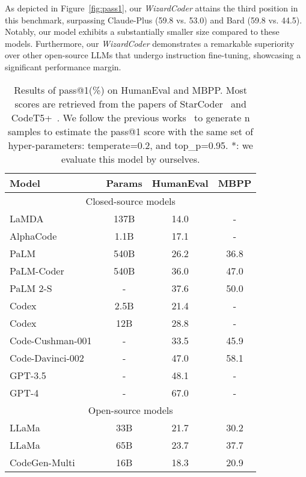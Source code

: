 \documentclass{article}
\newcommand{\modelname}{\emph{WizardCoder}}
\begin{document}
As depicted in Figure~\ref{fig:pass1}, our \modelname{} attains the third position in this benchmark, surpassing Claude-Plus (59.8 vs. 53.0) and Bard (59.8 vs. 44.5). Notably, our model exhibits a substantially smaller size compared to these models. Furthermore, our \modelname{} demonstrates a remarkable superiority over other open-source LLMs that undergo instruction fine-tuning, showcasing a significant performance margin.

\begin{table}
    \centering
    \caption{Results of pass@1(\%) on HumanEval and MBPP. Most scores are retrieved from the papers of StarCoder~\cite{li2023starcoder} and CodeT5+~\cite{CodeT5+}. We follow the previous works~\cite{humeval} to generate n samples to estimate the pass@1 score with the same set of hyper-parameters: temperate=0.2, and top\_p=0.95. *: we evaluate this model by ourselves.}
    \begin{tabular}{lccc}
        \toprule
        \textbf{Model} & \textbf{Params} & \textbf{HumanEval} & \textbf{MBPP} \\
        \midrule
        \multicolumn{4}{c}{Closed-source models}\\
        \midrule
        LaMDA~\cite{LaMDA} & 137B & 14.0 & -\\
        AlphaCode~\cite{AlphaCode} & 1.1B & 17.1 & -\\
        PaLM~\cite{PaLM} & 540B & 26.2 & 36.8\\
        PaLM-Coder~\cite{PaLM} & 540B & 36.0 & 47.0\\
        PaLM 2-S~\cite{palm2} & - & 37.6 & 50.0\\
        Codex~\cite{codex} & 2.5B & 21.4 & -\\
        Codex~\cite{codex} & 12B & 28.8 & -\\
        Code-Cushman-001~\cite{Azure} & - & 33.5 & 45.9\\
        Code-Davinci-002~\cite{Azure} & - & 47.0 & 58.1\\
        GPT-3.5~\cite{GPT4} & - & 48.1 & -\\
        GPT-4~\cite{GPT4} & - & 67.0 & -\\
        \midrule
        \multicolumn{4}{c}{Open-source models}\\
        \midrule
        LLaMa~\cite{llama} & 33B & 21.7 & 30.2\\
        LLaMa~\cite{llama} & 65B & 23.7 & 37.7\\
        CodeGen-Multi~\cite{codegen} & 16B & 18.3 & 20.9\\

\end{tabular}
\end{table}
\end{document}
